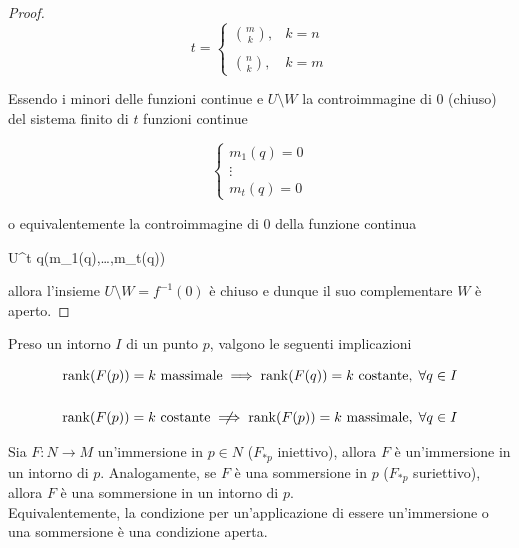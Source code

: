 \begin{proof}
	\begin{equation}
		t = %
		\begin{cases}
			\displaystyle \binom{m}{k}, & k = n \\\\
			\displaystyle \binom{n}{k}, & k = m
		\end{cases}
	\end{equation}

	Essendo i minori delle funzioni continue e $ U \setminus W $ la controimmagine di 0 (chiuso) del sistema finito di $ t $ funzioni continue
	
	\begin{equation}
		\begin{cases}
			m_{1}(q) = 0\\
			\vdots\\
			m_{t}(q) = 0
		\end{cases}
	\end{equation}

	o equivalentemente la controimmagine di 0 della funzione continua
	
		{U}{\R^{t}}
		{q}{(m_{1}(q),\dots,m_{t}(q))}

	allora l'insieme $ U \setminus W = f^{-1}(0) $ è chiuso e dunque il suo complementare $ W $ è aperto.
\end{proof}

\begin{remark}
	Preso un intorno $ I $ di un punto $ p $, valgono le seguenti implicazioni
	
	\begin{gather}
		\rank(F(p)) = k \text{ massimale} \implies \rank(F(q)) = k \text{ costante}, \; \forall q \in I \\
		\nonumber \\
		\rank(F(p)) = k \text{ costante} \notimplies \rank(F(p)) = k \text{ massimale}, \; \forall q \in I
	\end{gather}
\end{remark}

\begin{corollary}
	Sia $ F : N \to M $ un'immersione in $ p \in N $ ($ F_{*p} $ iniettivo), allora $ F $ è un'immersione in un intorno di $ p $. Analogamente, se $ F $ è una sommersione in $ p $ ($ F_{*p} $ suriettivo), allora $ F $ è una sommersione in un intorno di $ p $.\\
	Equivalentemente, la condizione per un'applicazione di essere un'immersione o una sommersione è una condizione aperta.
\end{corollary}

